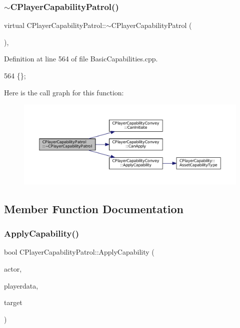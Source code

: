 \subsubsection{\texorpdfstring{$\sim$\+C\+Player\+Capability\+Patrol()}{~CPlayerCapabilityPatrol()}}
{\footnotesize\ttfamily virtual C\+Player\+Capability\+Patrol\+::$\sim$\+C\+Player\+Capability\+Patrol (\begin{DoxyParamCaption}{ }\end{DoxyParamCaption})\hspace{0.3cm}{\ttfamily [inline]}, {\ttfamily [virtual]}}



Definition at line 564 of file Basic\+Capabilities.\+cpp.


\begin{DoxyCode}
564 \{\};
\end{DoxyCode}
Here is the call graph for this function\+:\nopagebreak
\begin{figure}[H]
\begin{center}
\leavevmode
\includegraphics[width=350pt]{classCPlayerCapabilityPatrol_a1f27cf43aabf3360d5db92fd23b55c01_cgraph}
\end{center}
\end{figure}


\subsection{Member Function Documentation}
\hypertarget{classCPlayerCapabilityPatrol_a6b9e361d99e256efadcd99a829f93f51}{}\label{classCPlayerCapabilityPatrol_a6b9e361d99e256efadcd99a829f93f51} 
\subsubsection{\texorpdfstring{Apply\+Capability()}{ApplyCapability()}}
{\footnotesize\ttfamily bool C\+Player\+Capability\+Patrol\+::\+Apply\+Capability (\begin{DoxyParamCaption}\item[{std\+::shared\+\_\+ptr$<$ \hyperlink{classCPlayerAsset}{C\+Player\+Asset} $>$}]{actor,  }\item[{std\+::shared\+\_\+ptr$<$ \hyperlink{classCPlayerData}{C\+Player\+Data} $>$}]{playerdata,  }\item[{std\+::shared\+\_\+ptr$<$ \hyperlink{classCPlayerAsset}{C\+Player\+Asset} $>$}]{target }\end{DoxyParamCaption})\hspace{0.3cm}{\ttfamily [virtual]}}



